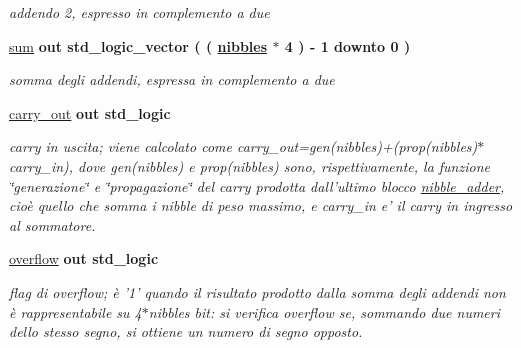 \begin{DoxyCompactItemize}
\begin{DoxyCompactList}\small\item\em addendo 2, espresso in complemento a due \end{DoxyCompactList}\item 
\hyperlink{group___carry_loockahead_ga1b4798a9e96bb32e9c08ce68e24e7871}{sum}  {\bfseries {\bfseries \textcolor{vhdlchar}{out}\textcolor{vhdlchar}{ }}} {\bfseries \textcolor{vhdlchar}{std\+\_\+logic\+\_\+vector}\textcolor{vhdlchar}{ }\textcolor{vhdlchar}{(}\textcolor{vhdlchar}{ }\textcolor{vhdlchar}{(}\textcolor{vhdlchar}{ }\textcolor{vhdlchar}{ }\textcolor{vhdlchar}{ }\textcolor{vhdlchar}{ }{\bfseries \hyperlink{group___carry_loockahead_ga0b63b586531492d0fa882246cca071c1}{nibbles}} \textcolor{vhdlchar}{$\ast$}\textcolor{vhdlchar}{ } \textcolor{vhdldigit}{4} \textcolor{vhdlchar}{ }\textcolor{vhdlchar}{)}\textcolor{vhdlchar}{ }\textcolor{vhdlchar}{-\/}\textcolor{vhdlchar}{ } \textcolor{vhdldigit}{1} \textcolor{vhdlchar}{ }\textcolor{vhdlchar}{downto}\textcolor{vhdlchar}{ }\textcolor{vhdlchar}{ } \textcolor{vhdldigit}{0} \textcolor{vhdlchar}{ }\textcolor{vhdlchar}{)}\textcolor{vhdlchar}{ }} 
\begin{DoxyCompactList}\small\item\em somma degli addendi, espressa in complemento a due \end{DoxyCompactList}\item 
\hyperlink{group___carry_loockahead_ga851aaea297bdc862fba5478c4bf0e214}{carry\+\_\+out}  {\bfseries {\bfseries \textcolor{vhdlchar}{out}\textcolor{vhdlchar}{ }}} {\bfseries \textcolor{vhdlchar}{std\+\_\+logic}\textcolor{vhdlchar}{ }} 
\begin{DoxyCompactList}\small\item\em carry in uscita; viene calcolato come carry\+\_\+out=gen(nibbles)+(prop(nibbles)$\ast$carry\+\_\+in), dove gen(nibbles) e prop(nibbles) sono, rispettivamente, la funzione \char`\"{}generazione\char`\"{} e \char`\"{}propagazione\char`\"{} del carry prodotta dall'ultimo blocco \hyperlink{classnibble__adder}{nibble\+\_\+adder}, cioè quello che somma i nibble di peso massimo, e carry\+\_\+in e' il carry in ingresso al sommatore. \end{DoxyCompactList}\item 
\hyperlink{group___carry_loockahead_ga9650307dde287e0bcfa1e26370c006c2}{overflow}  {\bfseries {\bfseries \textcolor{vhdlchar}{out}\textcolor{vhdlchar}{ }}} {\bfseries \textcolor{vhdlchar}{std\+\_\+logic}\textcolor{vhdlchar}{ }} 
\begin{DoxyCompactList}\small\item\em flag di overflow; è '1' quando il risultato prodotto dalla somma degli addendi non è rappresentabile su 4$\ast$nibbles bit\+: si verifica overflow se, sommando due numeri dello stesso segno, si ottiene un numero di segno opposto. \end{DoxyCompactList}\end{DoxyCompactItemize}
